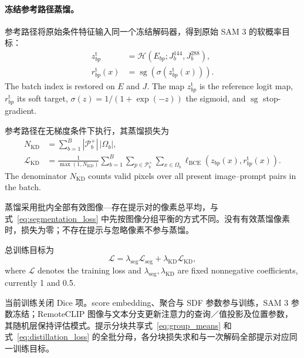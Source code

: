 \paragraph{冻结参考路径蒸馏。}
参考路径将原始条件特征输入同一个冻结解码器，得到原始 SAM 3 的软概率目标：
\begin{equation}
\begin{aligned}
 z^{\mathrm t}_{bp}&=\mathcal H(E_{bp};J_b^{144},J_b^{288}),\\
 r^{\mathrm t}_{bp}(x)&=\operatorname{sg}(\sigma(z^{\mathrm t}_{bp}(x))).
\end{aligned}
\label{eq:teacher_target}
\end{equation}
The batch index is restored on $E$ and $J$. The map $z^{\mathrm t}_{bp}$ is the reference logit map, $r^{\mathrm t}_{bp}$ its soft target, $\sigma(z)=1/(1+\exp(-z))$ the sigmoid, and $\operatorname{sg}$ stop-gradient.

参考路径在无梯度条件下执行，其蒸馏损失为
\begin{equation}
\begin{aligned}
 N_{\mathrm{KD}}&=\sum_{b=1}^{B}|\mathcal P_b^+|\,|\Omega_b|,\\
 \mathcal L_{\mathrm{KD}}&=\frac{1}{\max(1,N_{\mathrm{KD}})}\sum_{b=1}^{B}
 \sum_{p\in\mathcal P_b^+}\sum_{x\in\Omega_b}
 \ell_{\mathrm{BCE}}(z_{bp}(x),r^{\mathrm t}_{bp}(x)).
\end{aligned}
\label{eq:distillation_loss}
\end{equation}
The denominator $N_{\mathrm{KD}}$ counts valid pixels over all present image--prompt pairs in the batch.

蒸馏采用批内全部有效图像—存在提示对的像素总平均，与式~\eqref{eq:segmentation_loss} 中先按图像分组平衡的方式不同。没有有效蒸馏像素时，损失为零；不存在提示与忽略像素不参与蒸馏。

总训练目标为
\begin{equation}
 \mathcal L=\lambda_{\mathrm{seg}}\mathcal L_{\mathrm{seg}}
            +\lambda_{\mathrm{KD}}\mathcal L_{\mathrm{KD}},
 \label{eq:total_loss}
\end{equation}
where $\mathcal L$ denotes the training loss and $\lambda_{\mathrm{seg}},\lambda_{\mathrm{KD}}$ are fixed nonnegative coefficients, currently 1 and 0.5.

当前训练关闭 Dice 项。score embedding、聚合与 SDF 参数参与训练，SAM 3 参数冻结；RemoteCLIP 图像与文本分支更新注意力的查询／值投影及位置参数，其随机层保持评估模式。提示分块共享式~\eqref{eq:group_means} 和式~\eqref{eq:distillation_loss} 的全批分母，各分块损失求和与一次解码全部提示对应同一训练目标。

